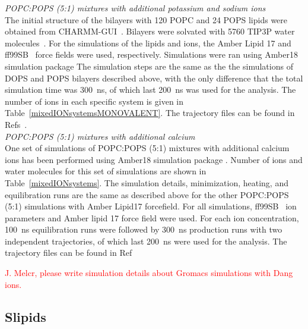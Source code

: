 \documentclass[journal=jpcbfk]{achemso}
\newcommand{\todo}[1]{\textcolor{red}{#1}}
\begin{document}
\noindent
{\it POPC:POPS (5:1) mixtures with additional potassium and sodium ions} \\

The initial structure of the bilayers with 120 POPC and 24 POPS lipids were obtained from CHARMM-GUI~\cite{lee16,jo18}.
Bilayers were solvated with 5760 TIP3P water molecules~\cite{jorgensen1983comparison}. For the simulations of the lipids and ions,
the Amber Lipid 17 \cite{gould18} and ff99SB~\cite{aqvist90} force fields were used, respectively.
Simulations were ran using Amber18 simulation package \cite{amber18md} 
The simulation steps are the same as the the simulations of
DOPS and POPS bilayers described above, with the only difference that the total simulation time was 300~ns, of which last 200~ns
was used for the analysis. The number of ions in each specific system is given in Table~\ref{mixedIONsystemsMONOVALENT}.
The trajectory files can be found in Refs~.\\

\noindent
{\it POPC:POPS (5:1) mixtures with additional calcium} \\

One set of simulations of POPC:POPS (5:1) mixtures with additional calcium ions has been performed using Amber18 simulation package \cite{amber18md}. Number of ions and water molecules for this set of simulations are shown in Table~\ref{mixedIONsystems}. The simulation details, minimization, heating, and equilibration runs are the same as described above for the other POPC:POPS (5:1) simulations with Amber Lipid17 forcefield. For all simulations, ff99SB~\cite{aqvist90} ion parameters and Amber lipid 17 force field were used. For each ion concentration, 100~ns equilibration runs were followed by 300~ns production runs with two independent trajectories, of which last 200~ns were used for the analysis. The trajectory files can be found in Ref~ 

\todo{J. Melcr, please write simulation details about Gromacs simulations with Dang ions.} \\

\subsection{Slipids}
\end{document}
